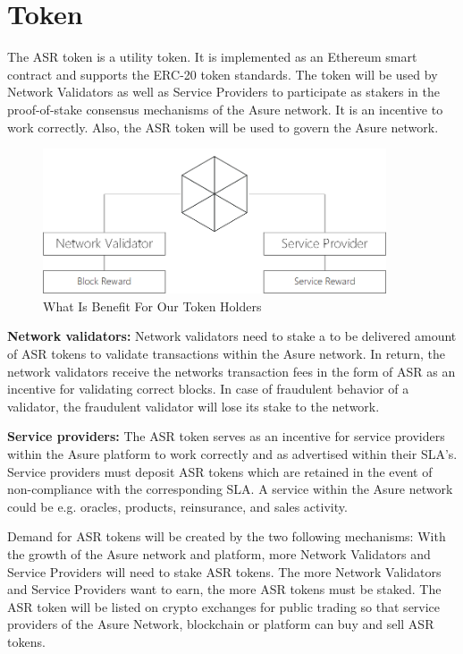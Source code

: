 \section{Token}

The ASR token is a utility token. It is implemented as an Ethereum smart contract and supports the ERC-20 token standards. The token will be used by Network Validators as well as Service Providers to participate as stakers in the proof-of-stake consensus mechanisms of the Asure network. It is an incentive to work correctly. Also, the ASR token will be used to govern the Asure network.

\begin{figure}[H]
    \centering
    \includegraphics[width=4.0in]{img/staking.png}
    \caption{What Is Benefit For Our Token Holders}
    \label{fig:asure_architecture}
\end{figure}

\textbf{Network validators:}
Network validators need to stake a to be delivered amount of ASR tokens to validate transactions within the Asure network. In return, the network validators receive the networks transaction fees in the form of ASR as an incentive for validating correct blocks. In case of fraudulent behavior of a validator, the fraudulent validator will lose its stake to the network.

\textbf{Service providers:}
The ASR token serves as an incentive for service providers within the Asure platform to work correctly and as advertised within their SLA’s. Service providers must deposit ASR tokens which are retained in the event of non-compliance with the corresponding SLA. A service within the Asure network could be e.g. oracles, products, reinsurance, and sales activity.\newline

Demand for ASR tokens will be created by the two following mechanisms: With the growth of the Asure network and platform, more Network Validators and Service Providers will need to stake ASR tokens. The more Network Validators and Service Providers want to earn, the more ASR tokens must be staked.\newline
The ASR token will be listed on crypto exchanges for public trading so that service providers of the Asure Network, blockchain or platform can buy and sell ASR tokens.\newline

